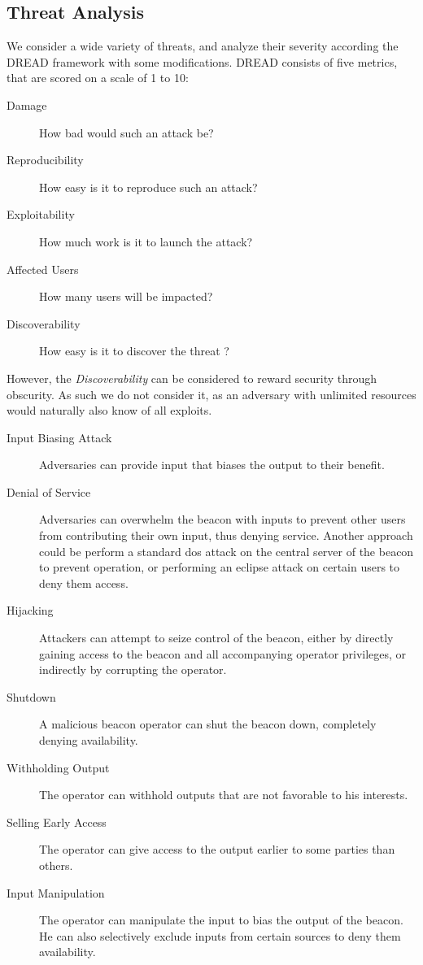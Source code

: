 \subsection{Threat Analysis}
We consider a wide variety of threats, and analyze their severity according the DREAD framework with some modifications. DREAD consists of five metrics\cite{dread}, that are scored on a scale of 1 to 10:
\begin{description}
    \item [Damage] How bad would such an attack be?
    \item [Reproducibility] How easy is it to reproduce such an attack?
    \item [Exploitability] How much work is it to launch the attack?
    \item [Affected Users] How many users will be impacted?
    \item [Discoverability] How easy is it to discover the threat ? 
\end{description}

However, the \emph{Discoverability} can be considered to reward security through obscurity. As such we do not consider it, as an adversary with unlimited resources would naturally also know of all exploits. 
\begin{description}
    \item [Input Biasing Attack] Adversaries can provide input that biases the output to their benefit. 
    \item [Denial of Service] Adversaries can overwhelm the beacon with inputs to prevent other users from contributing their own input, thus denying service. Another approach could be perform a standard \gls{dos} attack on the central server of the beacon to prevent operation, or performing an eclipse attack on certain users to deny them access. 
    \item [Hijacking] Attackers can attempt to seize control of the beacon, either by directly gaining access to the beacon and all accompanying operator privileges, or indirectly by corrupting the operator. 
    \item [Shutdown] A malicious beacon operator can shut the beacon down, completely denying availability.
    \item [Withholding Output] The operator can withhold outputs that are not favorable to his interests.
    \item [Selling Early Access] The operator can give access to the output earlier to some parties than others.
    \item [Input Manipulation] The operator can manipulate the input to bias the output of the beacon. He can also selectively exclude inputs from certain sources to deny them availability.

\end{description}
